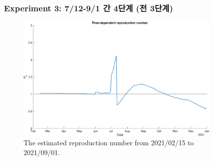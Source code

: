 \documentclass[aspectratio=169, 9pt, xcolor=dvipsnames]{beamer}
\begin{document}
	\begin{frame}\frametitle{Experiment 3: 7/12-9/1 간 4단계 (전 3단계)}
	    \begin{figure}
	    	\centering
	    	\includegraphics[width=10cm]{../results/predict_exp_3_sd3_same_school_same/rep_num.eps}
	    	\caption{The estimated reproduction number from 2021/02/15 to 2021/09/01.}
	    \end{figure}
	\end{frame}
\end{document}
